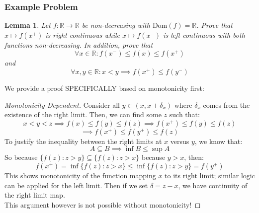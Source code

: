\documentclass[10pt,letterpaper]{article} %
\newtheorem{lem}{Lemma}[section]
\begin{document}
\subsubsection{Example Problem}
\begin{lem}
Let $f: \mathbb{R} \xrightarrow{} \mathbb{R}$ be non-decreasing with $\text{Dom}(f) = \mathbb{R}$. Prove that $x \mapsto f(x^+)$ is right continuous while $x \mapsto f(x^-)$ is left continuous with both functions non-decreasing. In addition, prove that
\begin{equation*}
\forall x \in \mathbb{R}: f(x^-) \leqslant f(x) \leqslant f(x^+)
\end{equation*}
and
\begin{equation*}
\forall x, y \in \mathbb{R}: x < y \implies f(x^+) \leqslant f(y^-)
\end{equation*}
\end{lem}
We provide a proof SPECIFICALLY based on monotonicity first:
\begin{proof}[Monotonicity Dependent]
Consider all $y \in (x, x + \delta_{x})$ where $\delta_{x}$ comes from the existence of the right limit. Then, we can find some $z$ such that:
\begin{equation*}
x < y < z \implies f(x) \leqslant f(y) \leqslant f(z) \implies f(x^+) \leqslant f(y) \leqslant f(z)
\end{equation*}
\begin{equation*}
\implies f(x^+) \leqslant f(y^+) \leqslant f(z)
\end{equation*}
To justify the inequality between the right limits at $x$ versus $y$, we know that:
\begin{equation*}
A \subseteq B \implies \inf B \leqslant \sup A
\end{equation*}
So because $\{f(z): z > y\} \subseteq \{f(z): z > x\}$ because $y > x$, then:
\begin{equation*}
f(x^+) = \inf\{f(z): z > x\} \leqslant \inf\{f(z): z > y\} = f(y^+)
\end{equation*}
This shows monotonicity of the function mapping $x$ to its right limit; similar logic can be applied for the left limit. Then if we set $\delta = z - x$, we have continuity of the right limit map.\\

This argument however is not possible without monotonicity!
\end{proof}
\end{document}
